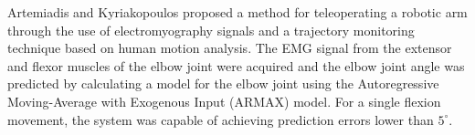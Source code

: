 \documentclass[letterpaper, 10 pt, conference]{ieeeconf}  %
\begin{document}
% 
% 




Artemiadis and Kyriakopoulos \cite{Artemiadis1642196} proposed a method for teleoperating a robotic arm through the use of electromyography signals and a trajectory monitoring technique based on human motion analysis. The EMG signal from the extensor and flexor muscles of the elbow joint were acquired and the elbow joint angle was predicted by calculating a model for the elbow joint using the Autoregressive Moving-Average with Exogenous Input (ARMAX) model. 
For a single flexion movement, the system was capable of achieving prediction errors lower than \(5^{\circ}\).

\end{document}
